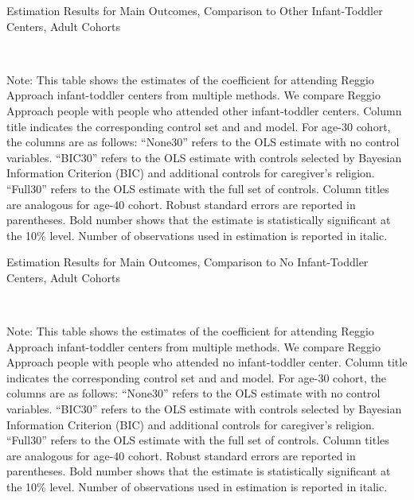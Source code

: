 \begin{table}[H] \caption{Estimation Results for Main Outcomes, Comparison to Other Infant-Toddler Centers, Adult Cohorts} \label{ols-M-adult-reg-pres-asilo}
\scalebox{0.75}{}
\vspace{1ex} \\
\footnotesize\raggedright{Note: This table shows the estimates of the coefficient for attending Reggio Approach infant-toddler centers from multiple methods. We compare Reggio Approach people with people who attended other infant-toddler centers.  Column title indicates the corresponding control set and and model. For age-30 cohort, the columns are as follows: ``None30'' refers to the OLS estimate with no control variables. ``BIC30'' refers to the OLS estimate with controls selected by Bayesian Information Criterion (BIC) and additional controls for caregiver's religion. ``Full30'' refers to the OLS estimate with the full set of controls. Column titles are analogous for age-40 cohort. Robust standard errors are reported in parentheses. Bold number shows that the estimate is statistically significant at the 10\% level. Number of observations used in estimation is reported in italic.}
\end{table}

\begin{table}[H] \caption{Estimation Results for Main Outcomes, Comparison to No Infant-Toddler Centers, Adult Cohorts} \label{ols-M-adult-reg-nopres-asilo}
\scalebox{0.75}{}
\vspace{1ex} \\
\footnotesize\raggedright{Note: This table shows the estimates of the coefficient for attending Reggio Approach infant-toddler centers from multiple methods. We compare Reggio Approach people with people who attended no infant-toddler center. Column title indicates the corresponding control set and and model. For age-30 cohort, the columns are as follows: ``None30'' refers to the OLS estimate with no control variables. ``BIC30'' refers to the OLS estimate with controls selected by Bayesian Information Criterion (BIC) and additional controls for caregiver's religion. ``Full30'' refers to the OLS estimate with the full set of controls. Column titles are analogous for age-40 cohort. Robust standard errors are reported in parentheses. Bold number shows that the estimate is statistically significant at the 10\% level. Number of observations used in estimation is reported in italic.}
\end{table}














